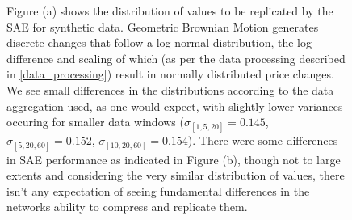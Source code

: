 \documentclass[a4paper,11pt,oneside]{article}
\theoremstyle{plain}
\theoremstyle{definition}
\begin{document}
\begin{figure}[H]
{			\newline Figure (a) shows the distribution of values to be replicated by the SAE for synthetic data. Geometric Brownian Motion generates discrete changes that follow a log-normal distribution, the log difference and scaling of which (as per the data processing described in \ref{data_processing}) result in normally distributed price changes. We see small differences in the distributions according to the data aggregation used, as one would expect, with slightly lower variances occuring for smaller data windows ($\sigma_{[1,5,20]} = 0.145$, $\sigma_{[5,20,60]} = 0.152$, $\sigma_{[10,20,60]} = 0.154$). There were some differences in SAE performance as indicated in Figure (b), though not to large extents and considering the very similar distribution of values, there isn't any expectation of seeing fundamental differences in the networks ability to compress and replicate them. }
		\label{figure-data_sae_synthetic}
	\end{figure}
	
\end{document}
